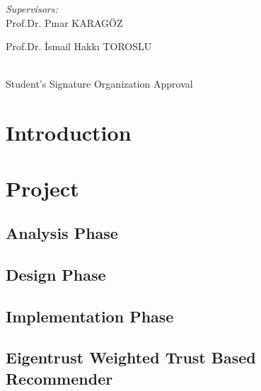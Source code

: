 \documentclass[12pt]{article}
\begin{document}
\begin{titlepage}
\begin{minipage}{0.4\textwidth}
			
		\end{minipage}
		\begin{minipage}{0.4\textwidth}
			\begin{flushright} \large
				\emph{Supervisors:} \\
				Prof.Dr. Pınar KARAGÖZ \\
			\end{flushright}
			\begin{flushright} \large
				Prof.Dr. İsmail Hakkı TOROSLU \\
			\end{flushright}
		\end{minipage}\\[1cm]
		\vspace{2cm}
		Student's Signature \hspace{150px} Organization Approval \\
	\end{titlepage}
	
	
	\tableofcontents          
	\newpage
	
	\section{Introduction}
	

	\section{Project}
	

	\subsection{Analysis Phase}
	
	
	\subsection{Design Phase}
	
	
	\subsection{Implementation Phase}
	
	
	\subsection{Eigentrust Weighted Trust Based Recommender}
	
	
\end{document}
